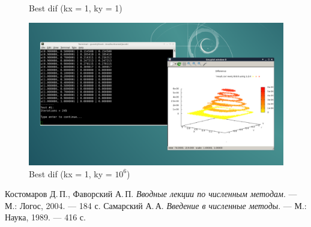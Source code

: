 \documentclass[a4paper, fleqn]{report}
\begin{document}
\begin{figure}[h]
\begin{minipage}{0.49\textwidth}
        \caption{Best dif (kx = 1, ky = 1)}
    \end{minipage}%
    \begin{minipage}{0.49\textwidth}
        \centering
        \includegraphics[width=\textwidth]{media/best_dif_1_1000000.png}
        \caption{Best dif (kx = 1, ky = $10^6$)}
    \end{minipage}
\end{figure}


\begin{thebibliography}{2}
\renewcommand{\bibname}{Литература}
Костомаров Д.\,П., Фаворский А.\,П. \textit{Вводные лекции по численным методам}. — М.: Логос, 2004. — 184 с.
Самарский А.\,А. \textit{Введение в численные методы}. — М.: Наука, 1989. — 416 с.
\end{thebibliography}
\end{document}
